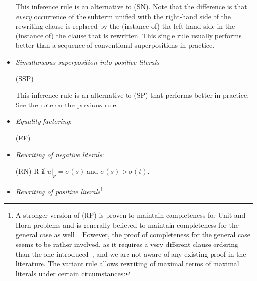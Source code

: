\documentclass{report}
\begin{document}
\begin{definition}
\begin{itemize}
   This inference rule is an alternative to (SN). Note that the
   difference is that \emph{every} occurrence of the subterm unified
   with the right-hand side of the rewriting clause is replaced by the
   (instance of) the left hand side in the (instance of) the clause
   that is rewritten. This single rule usually performs better than a
   sequence of conventional superpositions in practice.

\item \emph{Simultaneous superposition into positive literals}

  \bigskip (SSP) 

  This inference rule is an alternative to (SP) that performs better
  in practice. See the note on the previous rule.

 \item \emph{Equality factoring}:

   \bigskip (EF) 


 \item \emph{Rewriting of negative literals}:

   \bigskip (RN)  {
     \phantom{ae}  \vee R} {if
     $u|_p = \sigma(s)$ and $\sigma(s)>\sigma(t)$.}


 \item \emph{Rewriting of positive
     literals}\footnote{A stronger version of (RP)
     is proven to maintain completeness for Unit and Horn problems
     and is generally believed to maintain completeness for the
     general case as well~\cite{Bachmair:personal-98}.  However, the
     proof of completeness for the general case seems to be rather
     involved, as it requires a very different clause ordering than
     the one introduced~\cite{BG94}, and we are not aware of any
     existing proof in the literature. The variant rule allows
     rewriting of maximal terms of maximal literals under certain
     circumstances:

}
\end{itemize}
\end{definition}
\end{document}

